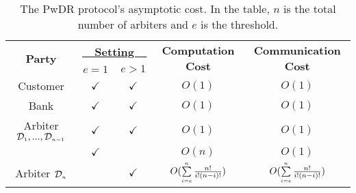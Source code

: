 

 \begin{table*}[!htbp]

\caption{ \small The PwDR protocol's asymptotic cost. In the table, $n$ is the total number of arbiters and $e$ is the threshold.} \label{table::PwDR-Asymptotic-Cost} 
\begin{center}

\begin{tabular}{|c|c|c|c|c|} 

   \hline
   


\multirow{2}{*}{\scriptsize \textbf{Party}}& \multicolumn{2}{c|}{\scriptsize \underline{\textbf{\ \  Setting\ \ }}}&\multirow{2}{*}{\scriptsize \textbf{Computation  Cost}}&\multirow{2}{*}{\scriptsize \textbf{Communication Cost}}\\

&\scriptsize$e=1$&\scriptsize$e>1$& &\\
\hline

\scriptsize Customer&\scriptsize$\checkmark$&\scriptsize$\checkmark$& \cellcolor{gray!20}\scriptsize$O(1)$& \cellcolor{gray!20}\scriptsize$O(1)$\\
     \cline{1-5}  
\scriptsize Bank&\scriptsize$\checkmark$&\scriptsize$\checkmark$& \cellcolor{gray!20}\scriptsize$O(1)$ & \cellcolor{gray!20}\scriptsize$O(1)$\\
      \cline{1-5}   
      

       
   \scriptsize   {Arbiter $\mathcal{D}_{\scriptscriptstyle 1},..., \mathcal{D}_{\scriptscriptstyle n-1}$ }&\scriptsize$\checkmark$&\scriptsize$\checkmark$& \cellcolor{gray!20}\scriptsize$O(1)$& \cellcolor{gray!20}\scriptsize$ O(1)$\\      
            \cline{1-5} 

&\scriptsize$\checkmark$&& \cellcolor{gray!20}\scriptsize$O(n)$& \cellcolor{gray!20}\scriptsize$ O(1)$\\
     \cline{2-5}
\multirow{-2}{*}{\scriptsize Arbiter $\mathcal{D}_{\scriptscriptstyle n}$}&&\scriptsize$\checkmark$& \cellcolor{gray!20}\scriptsize$O(\sum\limits_{\scriptscriptstyle i=e}^{\scriptscriptstyle n}\frac{n!}{i!(n- i)!})$& \cellcolor{gray!20}\scriptsize$ O(\sum\limits_{\scriptscriptstyle i=e}^{\scriptscriptstyle n}\frac{n!}{i!(n- i)!})$\\
     \cline{1-5}  
     

\end{tabular}
\end{center}
\end{table*}
